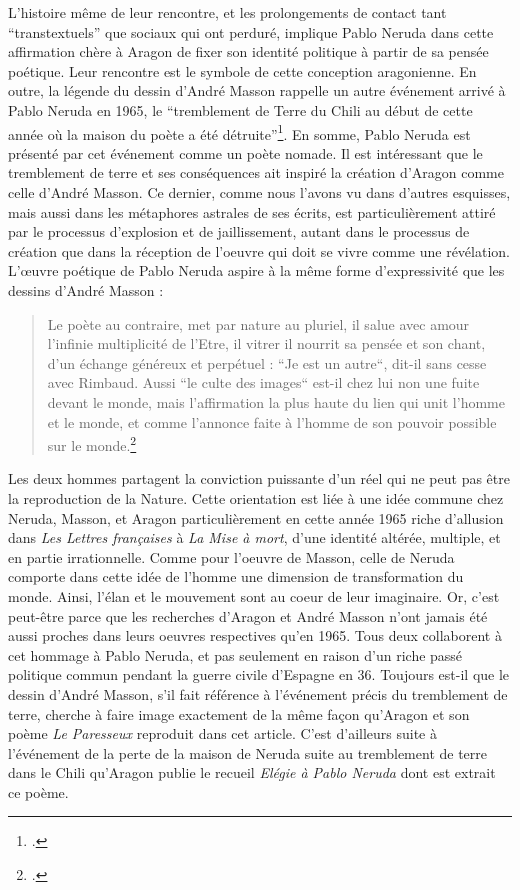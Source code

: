 L’histoire même de leur rencontre, et les prolongements de contact tant \enquote{transtextuels} que sociaux qui ont perduré, implique Pablo Neruda dans cette affirmation chère à Aragon de fixer son identité politique à partir de sa pensée poétique. Leur rencontre est le symbole de cette conception aragonienne. En outre, la légende du dessin d’André Masson rappelle un autre événement arrivé à Pablo Neruda en 1965, le \enquote{tremblement de Terre du Chili au début de cette année où la maison du poète a été détruite}\footcite{pabloneruda}. En somme, Pablo Neruda est présenté par cet événement comme un poète nomade. Il est intéressant que le tremblement de terre et ses conséquences ait inspiré la création d’Aragon comme celle d’André Masson. Ce dernier, comme nous l’avons vu dans d’autres esquisses, mais aussi dans les métaphores astrales de ses écrits, est particulièrement attiré par le processus d’explosion et de jaillissement, autant dans le processus de création que dans la réception de l’oeuvre qui doit se vivre comme une révélation. L’\oe{}uvre poétique de Pablo Neruda aspire à la même forme d’expressivité que les dessins d’André Masson :

\begin{quote}
Le poète au contraire, met par nature au pluriel, il salue avec amour l’infinie multiplicité de l’Etre, il vitrer il nourrit sa pensée et son chant, d’un échange généreux et perpétuel : “Je est un autre“, dit-il sans cesse avec Rimbaud. Aussi “le culte des images“ est-il chez lui non une fuite devant le monde, mais l’affirmation la plus haute du lien qui unit l’homme et le monde, et comme l’annonce faite à l’homme de son pouvoir possible sur le monde.\footcite{marcenac2004pablo}\end{quote}	


	Les deux hommes partagent la conviction puissante d’un réel qui ne peut pas être la reproduction de la Nature. Cette orientation est liée à une idée commune chez Neruda, Masson, et Aragon particulièrement en cette année 1965 riche d’allusion dans \emph{Les Lettres françaises} à \emph{La Mise à mort}, d’une identité altérée, multiple, et en partie irrationnelle. Comme pour l’oeuvre de Masson, celle de Neruda comporte dans cette idée de l’homme une dimension de transformation du monde. Ainsi, l’élan et le mouvement sont au coeur de leur imaginaire. Or, c’est peut-être parce que les recherches d’Aragon et André Masson n’ont jamais été aussi proches dans leurs oeuvres respectives qu’en 1965. Tous deux collaborent à cet hommage à Pablo Neruda, et pas seulement en raison d'un riche passé politique commun pendant la guerre civile d’Espagne en 36.  Toujours est-il que le dessin d’André Masson, s’il fait référence à l’événement précis du tremblement de terre, cherche à faire image exactement de la même façon qu’Aragon et son poème \emph{Le Paresseux} reproduit dans cet article. C’est d’ailleurs suite à l’événement de la perte de la maison de Neruda suite au tremblement de terre dans le Chili qu’Aragon publie le recueil \emph{Elégie à Pablo Neruda} dont est extrait ce poème. 

